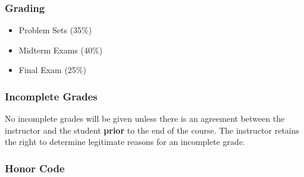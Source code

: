 \documentclass[12pt]{article}
\begin{document}

		
	\subsubsection*{Grading }		
	
			\begin{itemize}
			\item Problem Sets (35\%)
			\item Midterm Exams (40\%)
			\item Final Exam (25\%)
			\end{itemize}
			
			\subsubsection*{Incomplete Grades}
			No incomplete grades will be given unless there is an agreement between the instructor and the student {\bf prior} to the end of the course.  The instructor retains the right to determine legitimate reasons for an incomplete grade.
			
\subsubsection*{Honor Code}
\end{document}

